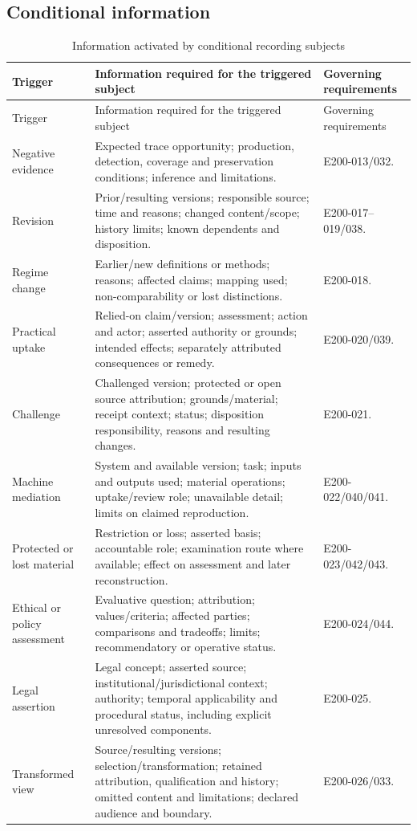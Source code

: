 \documentclass[11pt,a4paper]{article}
\begin{document}
\subsection{Conditional information}
\begin{longtable}{L{0.18\textwidth}L{0.48\textwidth}L{0.22\textwidth}}
\caption{Information activated by conditional recording subjects}\label{tab:gr200-conditional}\\
\toprule
Trigger & Information required for the triggered subject & Governing requirements\\
\midrule\endfirsthead
\toprule
Trigger & Information required for the triggered subject & Governing requirements\\
\midrule\endhead
Negative evidence & Expected trace opportunity; production, detection, coverage and preservation conditions; inference and limitations. & E200-013/032.\\
Revision & Prior/resulting versions; responsible source; time and reasons; changed content/scope; history limits; known dependents and disposition. & E200-017--019/038.\\
Regime change & Earlier/new definitions or methods; reasons; affected claims; mapping used; non-comparability or lost distinctions. & E200-018.\\
Practical uptake & Relied-on claim/version; assessment; action and actor; asserted authority or grounds; intended effects; separately attributed consequences or remedy. & E200-020/039.\\
Challenge & Challenged version; protected or open source attribution; grounds/material; receipt context; status; disposition responsibility, reasons and resulting changes. & E200-021.\\
Machine mediation & System and available version; task; inputs and outputs used; material operations; uptake/review role; unavailable detail; limits on claimed reproduction. & E200-022/040/041.\\
Protected or lost material & Restriction or loss; asserted basis; accountable role; examination route where available; effect on assessment and later reconstruction. & E200-023/042/043.\\
Ethical or policy assessment & Evaluative question; attribution; values/criteria; affected parties; comparisons and tradeoffs; limits; recommendatory or operative status. & E200-024/044.\\
Legal assertion & Legal concept; asserted source; institutional/jurisdictional context; authority; temporal applicability and procedural status, including explicit unresolved components. & E200-025.\\
Transformed view & Source/resulting versions; selection/transformation; retained attribution, qualification and history; omitted content and limitations; declared audience and boundary. & E200-026/033.\\
\bottomrule
\end{longtable}
\end{document}
